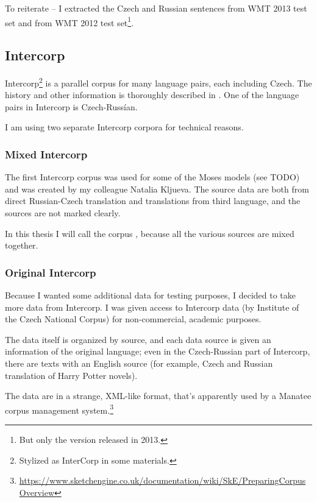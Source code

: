 
To reiterate -- I extracted the Czech and Russian sentences from WMT 2013 test set and from WMT 2012 test set\footnote{But only the version released in 2013.}.

\subsection{Intercorp}
\label{intercorp_p1}
Intercorp\footnote{Stylized as InterCorp in some materials.} is a parallel corpus for many language pairs, each including Czech. The history and other information is thoroughly described in \cite{intercorp}. One of the language pairs in Intercorp is Czech-Russían.

I am using two separate Intercorp corpora for technical reasons. 

\subsubsection{Mixed Intercorp}
The first Intercorp corpus was used for some of the Moses models (see TODO) and was created by my colleague Natalia Kljueva. 
The source data are both from direct Russian-Czech translation and translations from third language, and the sources are not marked clearly.

In this thesis I will call the corpus , because all the various sources are mixed together.

\subsubsection{Original Intercorp}

Because I wanted some additional data for testing purposes, I decided to take more data from Intercorp. 
I was  given access to  Intercorp data (by Institute of the Czech National Corpus) for non-commercial, academic purposes.

The data itself is organized by source, and each data source is given an information of the original language; even in the Czech-Russian part of Intercorp, there are texts with an English source (for example, Czech and Russian translation of Harry Potter novels). 

The data are in a strange, XML-like format, that's apparently used by a Manatee corpus management system.\footnote{\url{https://www.sketchengine.co.uk/documentation/wiki/SkE/PreparingCorpusOverview}}

